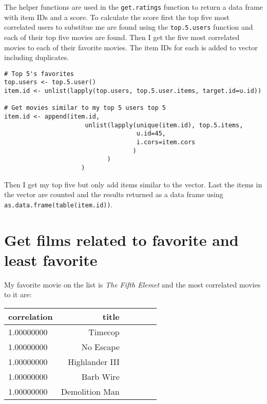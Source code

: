 \documentclass[12pt, a4paper]{article}
\newcommand{\code}[1]{\texttt{#1}}
\begin{document}
\newpage
The helper functions are used in the \code{get.ratings} function to return a data frame with item IDs and a score. To calculate the score first the top five most correlated users to substitue me are found using the \code{top.5.users} function and each of their top five movies are found. Then I get the five most correlated movies to each of their favorite movies. The item IDs for each is added to vector including duplicates.

\begin{minipage}{\linewidth} %
\vspace{2em}
\begin{verbatim}
# Top 5's favorites
top.users <- top.5.user()
item.id <- unlist(lapply(top.users, top.5.user.items, target.id=u.id))

# Get movies similar to my top 5 users top 5
item.id <- append(item.id,
                      unlist(lapply(unique(item.id), top.5.items, 
                                    u.id=45, 
                                    i.cors=item.cors
                                   )
                            )
                     )
\end{verbatim}
\vspace{2em}
\end{minipage}
    
Then I get my top five but only add items similar to the vector. Last the items in the vector are counted and the results returned as a data frame using \code{as.data.frame(table(item.id))}.


\newpage
\section{Get films related to favorite and least favorite}

My favorite movie on the list is \emph{The Fifth Elemet} and the most correlated movies to it are:

\begin{minipage}{\linewidth} %
\vspace{2em}
\centering
\begin{tabular}{|l|r|r|l|l|l|}
        \hline
        correlation & title\\
        \hline
        1.00000000 & Timecop\\
        \hline
        1.00000000 & No Escape\\
        \hline
        1.00000000 & Highlander III\\
        \hline
        1.00000000 & Barb Wire\\
        \hline
        1.00000000 & Demolition Man\\
        \hline
\end{tabular}
\vspace{2em}
\end{minipage}
\end{document}
